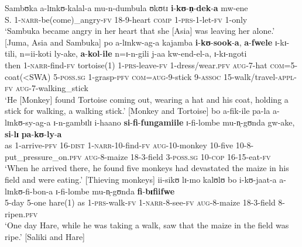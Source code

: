 \begin{exe} %
\ex \label{exPRSparadigmsInComplementPerception1} \gll Sambʊka a-lɪnkʊ-kalal-a mu-n-dumbula ʊkʊtɪ \textbf{i}-\textbf{kʊ}-\textbf{n̩}-\textbf{dek}-\textbf{a} mw-ene\\
S. 1-\textsc{narr}-be(come)\_angry-\textsc{fv} 18-9-heart \textsc{comp} 1-\textsc{prs}-1-let-\textsc{fv} 1-only\\
\glt `Sambuka became angry in her heart that she [Asia] was leaving her alone.' [Juma, Asia and Sambuka]
\ex \label{exPRSparadigmsInComplementCognition1}\gll po a-lɪnkw-ag-a kajamba \textbf{i}-\textbf{kʊ}-\textbf{sook}-\textbf{a}, \textbf{a}-\textbf{fwele} ɪ-kɪ-tili, n=ii-koti ly-ake, \textbf{a}-\textbf{kol}-\textbf{ile} n=ɪ-n-gili j-aa kw-end-el-a, ɪ-kɪ-ngoti\\
then 1-\textsc{narr}-find-\textsc{fv} tortoise(1) 1-\textsc{prs}-leave-\textsc{fv} 1-dress/wear.\textsc{pfv} \textsc{aug}-7-hat \textsc{com}=5-coat(<SWA) 5-\textsc{poss.sg} 1-grasp-\textsc{pfv} \textsc{com}=\textsc{aug}-9-stick 9-\textsc{assoc} 15-walk/travel-\textsc{appl}-\textsc{fv} \textsc{aug}-7-walking\_stick\\
\glt `He [Monkey] found Tortoise coming out, wearing a hat and his coat, holding a stick for walking,  a walking stick.' [Monkey and Tortoise]
\ex \label{exPRSparadigmsInComplementCognition2} \gll bo a-fik-ile pa-la a-lɪnkʊ-sy-ag-a ɪ-n-gambɪlɪ i-haano \textbf{si}-\textbf{fi}-\textbf{fungamiile} ɪ-fi-lombe mu-n̩-gʊnda gw-ake, \textbf{si}-\textbf{lɪ} \textbf{pa}-\textbf{kʊ}-\textbf{ly}-\textbf{a}\\
as 1-arrive-\textsc{pfv} 16-\textsc{dist} 1-\textsc{narr}-10-find-\textsc{fv} \textsc{aug}-10-monkey 10-five 10-8-put\_pressure\_on.\textsc{pfv} \textsc{aug}-8-maize 18-3-field 3-\textsc{poss.sg} 10-\textsc{cop} 16-15-eat-\textsc{fv}\\
\glt `When he arrived there, he found five monkeys had devastated the maize in his field and were eating.' [Thieving monkeys]
\ex \label{exPRSparadigmsInComplementPerception2}%
\gll ii-sikʊ lɪ-mo kalʊlʊ bo i-kʊ-jaat-a a-lɪnkʊ-fi-bon-a ɪ-fi-lombe mu-n̩-gʊnda \textbf{fi}-\textbf{bɪfiifwe}\\
5-day 5-one hare(1) as 1-\textsc{prs}-walk-\textsc{fv} 1-\textsc{narr}-8-see-\textsc{fv} \textsc{aug}-8-maize 18-3-field 8-ripen.\textsc{pfv}\\
\glt \lq One day Hare, while he was taking a walk, saw that the maize in the field was ripe.' [Saliki and Hare]
\end{exe}

